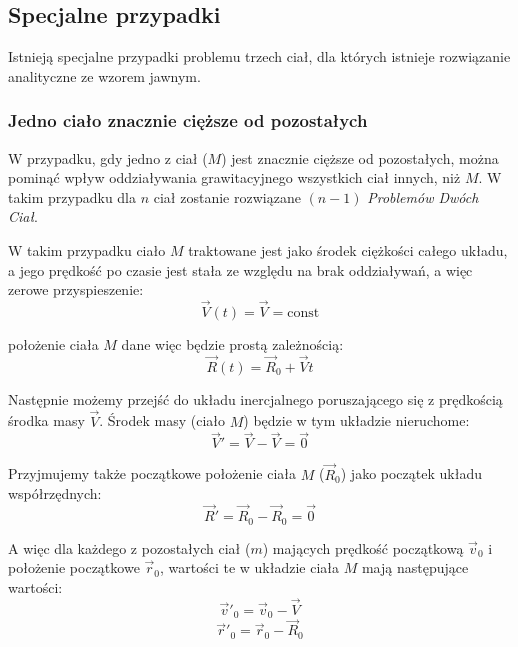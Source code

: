 \documentclass{article}
\begin{document}
\subsection{Specjalne przypadki}
Istnieją specjalne przypadki problemu trzech ciał, dla których istnieje rozwiązanie analityczne ze wzorem jawnym.

\subsubsection{Jedno ciało znacznie cięższe od pozostałych}
\label{sec:introduction:special_cases:one_heavy_body}
W przypadku, gdy jedno z ciał ($M$) jest znacznie cięższe od pozostałych, można pominąć wpływ oddziaływania grawitacyjnego wszystkich ciał innych, niż $M$. W takim przypadku dla $n$ ciał zostanie rozwiązane $(n-1)$ \textit{Problemów Dwóch Ciał}.

W takim przypadku ciało $M$ traktowane jest jako środek ciężkości całego układu, a jego prędkość po czasie jest stała ze względu na brak oddziaływań, a więc zerowe przyspieszenie:
\begin{displaymath}
    \vec{V}(t) = \vec{V} = \mathrm{const}
\end{displaymath}

położenie ciała $M$ dane więc będzie prostą zależnością:
\begin{displaymath}
    \vec{R}(t) = \vec{R}_0 + \vec{V} t
\label{eq:one_body_center_of_mass}
\end{displaymath}

Następnie możemy przejść do układu inercjalnego poruszającego się z prędkością środka masy $\vec{V}$. Środek masy (ciało $M$) będzie w tym układzie nieruchome:
\begin{displaymath}
    \vec{V}'= \vec{V} - \vec{V} = \vec{0}
\end{displaymath}

Przyjmujemy także początkowe położenie ciała $M$ ($\vec{R}_0$) jako początek układu współrzędnych:
\begin{displaymath}
    \vec{R}' = \vec{R}_0 - \vec{R}_0 = \vec{0}
\end{displaymath}

A więc dla każdego z pozostałych ciał ($m$) mających prędkość początkową $\vec{v}_0$ i położenie początkowe $\vec{r}_0$, wartości te w układzie ciała $M$ mają następujące wartości:
\begin{equation}
    \vec{v}'_0 = \vec{v}_0 - \vec{V}
\label{eq:one_body_v}
\end{equation}
\begin{equation}
    \vec{r}'_0 = \vec{r}_0 - \vec{R}_0
\label{eq:one_body_r}
\end{equation}
\end{document}
